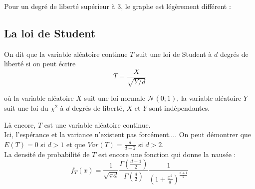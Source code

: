 \documentclass[12pt, a4paper]{book}
\numberwithin{equation}{section}
\begin{document}
\noindent Pour un degré de liberté supérieur à 3, le graphe est légèrement différent :

\begin{center}
\end{center}









\subsection{La loi de Student}
On dit que la variable aléatoire continue $T$ suit une loi de Student à $d$ degrés de liberté si on peut écrire
$$
T=\frac{X}{\sqrt{Y/d}}
$$

où la variable aléatoire $X$ suit une loi normale $\mathcal{N}(0;1)$, la variable aléatoire $Y$ suit une loi du $\chi^2$ à 
$d$ degrés de liberté, $X$ et $Y$ sont indépendantes.

\noindent Là encore, $T$ est une variable aléatoire continue.\\

\noindent Ici, l'espérance et la variance n'existent pas forcément.... On peut démontrer que $E(T)=0$ si $d>1$ et que
 $Var(T)=\frac{d}{d-2}$ si $d>2$.\\

\noindent La densité de probabilité de $T$ est encore une fonction qui donne la nausée : 
$$
f_T(x)=\frac{1}{\sqrt{\pi d}} \frac{\Gamma(\frac{d+1}{2})}{\Gamma(\frac{d}{2})} 
\frac{1}{(1+\frac{x^2}{d})^{\frac{d+1}{2}}}  
$$
\end{document}
